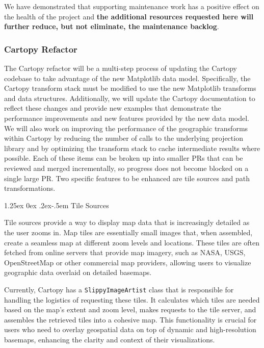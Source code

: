 \documentclass[12pt]{article}
\makeatletter
\numberwithin{page}{section}
\renewcommand{\paragraph}{%
  \@startsection{paragraph}{4}%
  {\z@}{1.25ex \@plus 0ex \@minus .2ex}{-.5em}%
  {\normalfont\normalsize\itshape\bfseries}%
}
\makeatother
\begin{document}
We have demonstrated that supporting maintenance work has a positive effect on
the health of the project and \textbf{the additional resources requested here
  will further reduce, but not eliminate, the maintenance backlog}.



\subsubsection{Cartopy Refactor}

The Cartopy refactor will be a multi-step process of updating the
Cartopy codebase to take advantage of the new Matplotlib data model.
Specifically, the Cartopy transform stack must be modified to use the new Matplotlib transforms
and data structures. Additionally, we will update the Cartopy documentation to
reflect these changes and provide new examples that demonstrate the performance
improvements and new features provided by the new data model. We will
also work on improving the performance of the geographic transforms within Cartopy
by reducing the number of calls to the underlying projection library and by optimizing
the transform stack to cache intermediate results where possible. Each of these items
can be broken up into smaller PRs that can be reviewed and merged
incrementally, so progress does not become blocked on a single
large PR. Two specific features to be enhanced are tile sources and path transformations.

\paragraph{Tile Sources}

Tile sources provide a way to display map data that is increasingly detailed
as the user zooms
in. Map tiles are essentially small images that, when assembled, create a seamless map at
different zoom levels and locations. These tiles are often fetched from online servers
that provide map imagery, such as NASA, USGS, OpenStreetMap or other commercial map providers,
allowing users to visualize geographic data overlaid on detailed basemaps.

Currently, Cartopy has a \texttt{SlippyImageArtist} class that is responsible for handling the
logistics of requesting these tiles. It calculates which tiles are needed based on the
map's extent and zoom level, makes requests to the tile server, and assembles the retrieved
tiles into a cohesive map. This functionality is crucial for users who need to overlay geospatial
data on top of dynamic and high-resolution basemaps, enhancing the clarity and context of
their visualizations.
\end{document}

